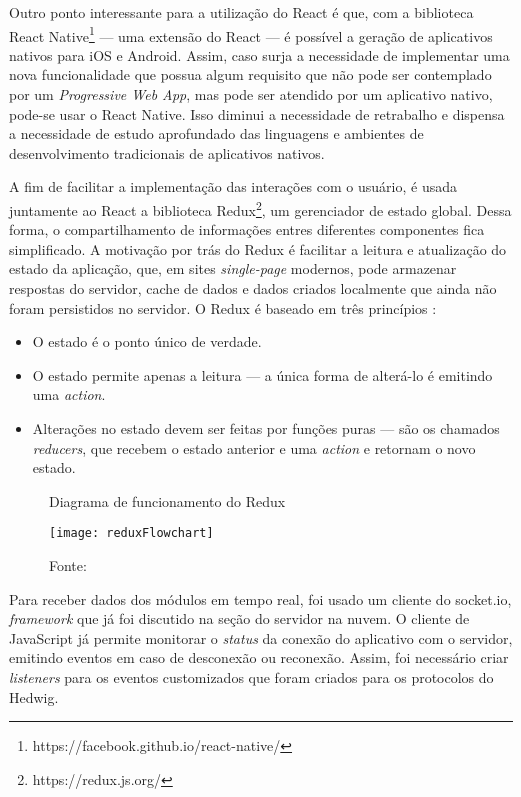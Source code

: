 Outro ponto interessante para a utilização do React é que, com a biblioteca React Native\footnote{https://facebook.github.io/react-native/} --- uma extensão do React --- é possível a geração de aplicativos nativos para iOS e Android. Assim, caso surja a necessidade de implementar uma nova funcionalidade que possua algum requisito que não pode ser contemplado por um \textit{Progressive Web App}, mas pode ser atendido por um aplicativo nativo, pode-se usar o React Native. Isso diminui a necessidade de retrabalho e dispensa a necessidade de estudo aprofundado das linguagens e ambientes de desenvolvimento tradicionais de aplicativos nativos.

A fim de facilitar a implementação das interações com o usuário, é usada juntamente ao React a biblioteca Redux\footnote{https://redux.js.org/}, um gerenciador de estado global. Dessa forma, o compartilhamento de informações entres diferentes componentes fica simplificado. A motivação por trás do Redux é facilitar a leitura e atualização do estado da aplicação, que, em sites \textit{single-page} modernos, pode armazenar respostas do servidor, cache de dados e dados criados localmente que ainda não foram persistidos no servidor. O Redux é baseado em três princípios \cite{redux}:

\begin{itemize}
\item O estado é o ponto único de verdade.
\item O estado permite apenas a leitura --- a única forma de alterá-lo é emitindo uma \textit{action}.
\item Alterações no estado devem ser feitas por funções puras --- são os chamados \textit{reducers}, que recebem o estado anterior e uma \textit{action} e retornam o novo estado.
\end{itemize}

\begin{figure}
	\centering
	\caption{Diagrama de funcionamento do Redux}
  \texttt{[image: reduxFlowchart]}
  \caption*{Fonte: \cite{reduxdataflow}}
\label{fig:reduxFlowchart}
\end{figure}

Para receber dados dos módulos em tempo real, foi usado um cliente do socket.io, \textit{framework} que já foi discutido na seção do servidor na nuvem. O cliente de JavaScript já permite monitorar o \textit{status} da conexão do aplicativo com o servidor, emitindo eventos em caso de desconexão ou reconexão. Assim, foi necessário criar \textit{listeners} para os eventos customizados que foram criados para os protocolos do Hedwig.

